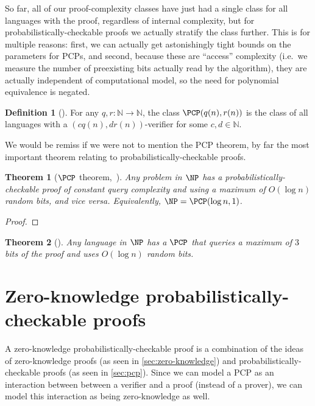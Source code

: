 \documentclass[english]{reedthesis}
\theoremstyle{plain}
\newtheorem{thm}{Theorem}[section]
\theoremstyle{definition}
\newtheorem{defn}[defn]{Definition}
\theoremstyle{remark}
\begin{document}
So far, all of our proof-complexity classes have just had a single class for all
languages with the proof, regardless of internal complexity, but for
probabilistically-checkable proofs we actually stratify the class further. This
is for multiple reasons: first, we can actually get astonishingly tight bounds
on the parameters for PCPs, and second, because these are ``access'' complexity
(i.e.\ we measure the number of preexisting bits actually read by the
algorithm), they are actually independent of computational model, so the need
for polynomial equivalence is negated.

\begin{defn}[{\cite[Def.\ 18.1]{AB09}}]\label{def:pcp}
  For any $q, r: \mathbb{N} \rightarrow \mathbb{N}$, the class $\PCP(q(n), r(n))$ is the class of all
  languages with a $(cq(n), dr(n))$-verifier for some $c, d \in \mathbb{N}$.
\end{defn}

We would be remiss if we were not to mention the PCP theorem, by far the most
important theorem relating to probabilistically-checkable proofs.

\begin{thm}[{$\PCP$ theorem,~\cite{AS98}}]\label{thm:pcp-theorem}
  Any problem in $\NP$ has a probabilistically-checkable proof of constant query
  complexity and using a maximum of $O(\log n)$ random bits, and vice versa.
  Equivalently, $\NP = \PCP(\log n, 1)$.
\end{thm}

\begin{proof}
\end{proof}



\begin{thm}[{\cite{Has97}}]\label{thm:pcp-max-queries}
  Any language in $\NP$ has a $\PCP$ that queries a maximum of $3$ bits of the
  proof and uses $O(\log n)$ random bits.
\end{thm}

\section{Zero-knowledge probabilistically-checkable proofs}\label{sec:pzkpcp}


A zero-knowledge probabilistically-checkable proof is a combination of the ideas
of zero-knowledge proofs (as seen in \cref{sec:zero-knowledge}) and
probabilistically-checkable proofs (as seen in \cref{sec:pcp}). Since we can
model a PCP as an interaction between between a verifier and a proof (instead of
a prover), we can model this interaction as being zero-knowledge as well.
\end{document}
